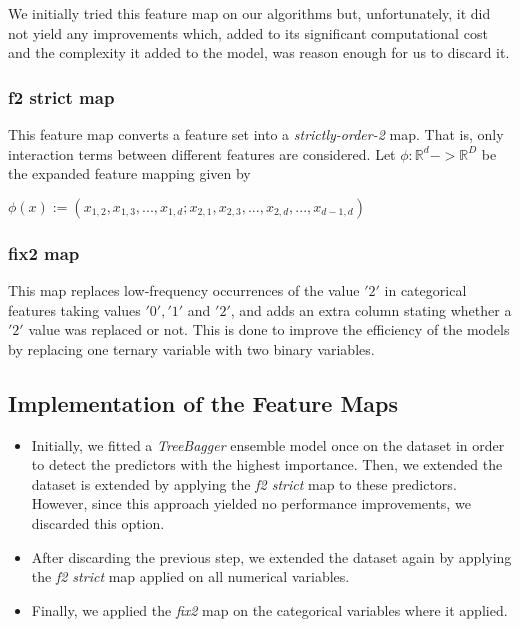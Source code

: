 We initially tried this feature map on our algorithms but, unfortunately, it did not yield any improvements which, added to its significant computational cost and the complexity it added to the model, was reason enough for us to discard it.

\subsubsection{f2 strict map}
 This feature map converts a feature set into a \textit{strictly-order-2} map. That is, only interaction terms between different features are considered. Let $\phi : \mathbb{R}^d -> \mathbb{R}^D$ be the expanded feature mapping given by \newline
 \begin{center}
 $\phi(x) := (x_{1,2}, x_{1,3}, ... , x_{1,d}; x_{2,1}, x_{2,3}, ... , x_{2,d}, ... ,x_{d-1,d}) $
 \end{center}

\subsubsection{fix2 map} 
This map replaces low-frequency occurrences of the value $'2'$ in categorical features taking values $'0','1'$ and $'2'$, and adds an extra column stating whether a $'2'$ value was replaced or not. This is done to improve the efficiency of the models by replacing one ternary variable with two binary variables. 


\subsection{Implementation of the Feature Maps}

\begin{itemize}
\item Initially, we fitted a \textit{TreeBagger} ensemble model once on the dataset in order to detect the predictors with the highest importance. Then, we extended the dataset is extended by applying the \textit{f2 strict} map to these predictors. However, since this approach yielded no performance improvements, we discarded this option.
\item After discarding the previous step, we extended the dataset again by applying the \textit{f2 strict} map applied on all numerical variables.
\item Finally, we applied the \textit{fix2} map on the categorical variables where it applied.
\end{itemize}


